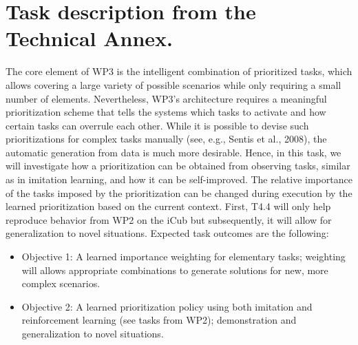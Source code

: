 \documentclass[12pt,a4paper,twoside]{report}
\begin{document}
\section{Task description from the Technical Annex.} 
The core element of WP3 is the intelligent combination of prioritized tasks, which allows covering a large
variety of possible scenarios while only requiring a small number of elements. Nevertheless, WP3’s
architecture requires a meaningful prioritization scheme that tells the systems which tasks to activate and
how certain tasks can overrule each other. While it is possible to devise such prioritizations for complex
tasks manually (see, e.g., Sentis et al., 2008), the automatic generation from data is much more desirable.
Hence, in this task, we will investigate how a prioritization can be obtained from observing tasks, similar as
in imitation learning, and how it can be self-improved. The relative importance of the tasks imposed by the
prioritization can be changed during execution by the learned prioritization based on the current context.
First, T4.4 will only help reproduce behavior from WP2 on the iCub but subsequently, it will allow for
generalization to novel situations. Expected task outcomes are the following:
\begin{itemize}
\item Objective 1: A learned importance weighting for elementary tasks; weighting will allows appropriate
combinations to generate solutions for new, more complex scenarios.
\item Objective 2: A learned prioritization policy using both imitation and reinforcement learning (see tasks from
WP2); demonstration and generalization to novel situations.
\end{itemize}
\end{document}
